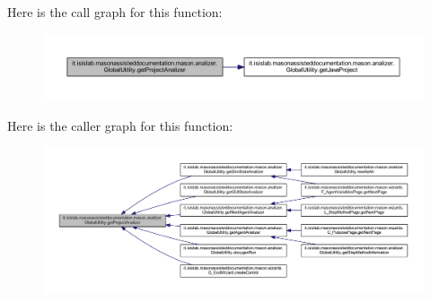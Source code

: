 Here is the call graph for this function\-:\nopagebreak
\begin{figure}[H]
\begin{center}
\leavevmode
\includegraphics[width=350pt]{classit_1_1isislab_1_1masonassisteddocumentation_1_1mason_1_1analizer_1_1_global_utility_a78cbdc6022c558d1375a01095ad95659_cgraph}
\end{center}
\end{figure}




Here is the caller graph for this function\-:\nopagebreak
\begin{figure}[H]
\begin{center}
\leavevmode
\includegraphics[width=350pt]{classit_1_1isislab_1_1masonassisteddocumentation_1_1mason_1_1analizer_1_1_global_utility_a78cbdc6022c558d1375a01095ad95659_icgraph}
\end{center}
\end{figure}


